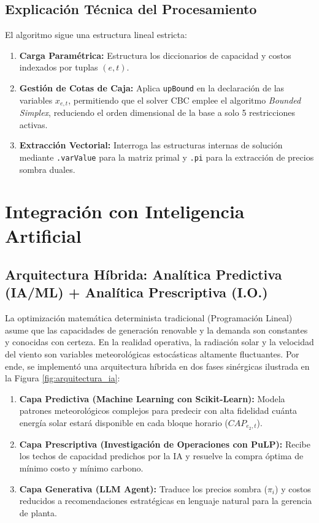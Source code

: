 \documentclass[11pt,a4paper]{article}
\begin{document}
\subsection{Explicación Técnica del Procesamiento}
El algoritmo sigue una estructura lineal estricta:
\begin{enumerate}
    \item \textbf{Carga Paramétrica:} Estructura los diccionarios de capacidad y costos indexados por tuplas $(e, t)$.
    \item \textbf{Gestión de Cotas de Caja:} Aplica \texttt{upBound} en la declaración de las variables $x_{e,t}$, permitiendo que el solver CBC emplee el algoritmo \textit{Bounded Simplex}, reduciendo el orden dimensional de la base a solo 5 restricciones activas.
    \item \textbf{Extracción Vectorial:} Interroga las estructuras internas de solución mediante \texttt{.varValue} para la matriz primal y \texttt{.pi} para la extracción de precios sombra duales.
\end{enumerate}

\section{Integración con Inteligencia Artificial}

\subsection{Arquitectura Híbrida: Analítica Predictiva (IA/ML) + Analítica Prescriptiva (I.O.)}
La optimización matemática determinista tradicional (Programación Lineal) asume que las capacidades de generación renovable y la demanda son constantes y conocidas con certeza. En la realidad operativa, la radiación solar y la velocidad del viento son variables meteorológicas estocásticas altamente fluctuantes. Por ende, se implementó una arquitectura híbrida en dos fases sinérgicas ilustrada en la Figura \ref{fig:arquitectura_ia}:
\begin{enumerate}
    \item \textbf{Capa Predictiva (Machine Learning con Scikit-Learn):} Modela patrones meteorológicos complejos para predecir con alta fidelidad cuánta energía solar estará disponible en cada bloque horario ($CAP_{e_2,t}$).
    \item \textbf{Capa Prescriptiva (Investigación de Operaciones con PuLP):} Recibe los techos de capacidad predichos por la IA y resuelve la compra óptima de mínimo costo y mínimo carbono.
    \item \textbf{Capa Generativa (LLM Agent):} Traduce los precios sombra ($\pi_i$) y costos reducidos a recomendaciones estratégicas en lenguaje natural para la gerencia de planta.
\end{enumerate}
\end{document}
